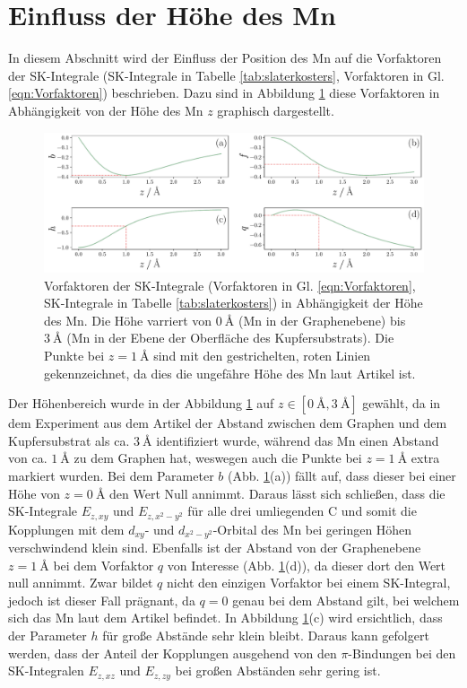 \section{Einfluss der Höhe des Mn}
In diesem Abschnitt wird der Einfluss der Position des Mn auf die Vorfaktoren der SK-Integrale (SK-Integrale in Tabelle \ref{tab:slaterkosters}, Vorfaktoren in Gl. \eqref{eqn:Vorfaktoren}) beschrieben.
Dazu sind in Abbildung \ref{fig:Faktoreninz} diese Vorfaktoren in Abhängigkeit von der Höhe des Mn $z$ graphisch dargestellt.
\begin{figure}
    \centering
    \includegraphics[width = \textwidth]{Plots/Faktoreninz.pdf}
    \caption{Vorfaktoren der SK-Integrale (Vorfaktoren in Gl. \eqref{eqn:Vorfaktoren}, SK-Integrale in Tabelle \ref{tab:slaterkosters}) in Abhängigkeit der Höhe des Mn.
    Die Höhe varriert von $\qty{0}{\angstrom}$ (Mn in der Graphenebene) bis $\qty{3}{\angstrom}$ (Mn in der Ebene der Oberfläche des Kupfersubstrats).
    Die Punkte bei $z = \qty{1}{\angstrom}$ sind mit den gestrichelten, roten Linien gekennzeichnet, da dies die ungefähre Höhe des Mn laut Artikel \cite{doi:10.1021/acsnano.1c00139} ist.}
    \label{fig:Faktoreninz}
\end{figure}
Der Höhenbereich wurde in der Abbildung \ref{fig:Faktoreninz} auf $z \in [\qty{0}{\angstrom}, \qty{3}{\angstrom}]$ gewählt, da in dem Experiment aus dem Artikel \cite{doi:10.1021/acsnano.1c00139} 
der Abstand zwischen dem Graphen und dem Kupfersubstrat als ca. $\qty{3}{\angstrom}$ identifiziert wurde, während das Mn einen Abstand von 
ca. $\qty{1}{\angstrom}$ zu dem Graphen hat, weswegen auch die Punkte bei $z = \qty{1}{\angstrom}$ extra markiert wurden.
Bei dem Parameter $b$ (Abb. \ref{fig:Faktoreninz}(a)) fällt auf, dass dieser bei einer Höhe von $z = \qty{0}{\angstrom} $ den Wert Null annimmt.
Daraus lässt sich schließen, dass die SK-Integrale $E_{z,xy}$ und $E_{z,x^2-y^2}$ für alle drei umliegenden C und somit die Kopplungen mit 
dem $d_{xy}$- und $d_{x^2-y^2}$-Orbital des Mn bei geringen Höhen verschwindend klein sind. 
Ebenfalls ist der Abstand von der Graphenebene $z=\qty{1}{\angstrom}$ bei dem Vorfaktor $q$ von Interesse (Abb. \ref{fig:Faktoreninz}(d)), da dieser dort den Wert null annimmt.
Zwar bildet $q$ nicht den einzigen Vorfaktor bei einem SK-Integral, jedoch ist dieser Fall prägnant, da $q=0$ genau bei dem Abstand gilt, 
bei welchem sich das Mn laut dem Artikel \cite{doi:10.1021/acsnano.1c00139} befindet.
In Abbildung \ref{fig:Faktoreninz}(c) wird ersichtlich, dass der Parameter $h$ für große Abstände sehr klein bleibt. 
Daraus kann gefolgert werden, dass der Anteil der Kopplungen ausgehend von den $\pi$-Bindungen bei den SK-Integralen $E_{z,xz}$ 
und $E_{z,zy}$ bei großen Abständen sehr gering ist.